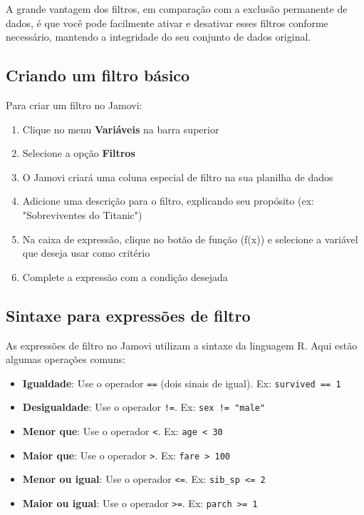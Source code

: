 A grande vantagem dos filtros, em comparação com a exclusão permanente de dados, é que você pode facilmente ativar e desativar esses filtros conforme necessário, mantendo a integridade do seu conjunto de dados original.

\subsection{Criando um filtro básico}

Para criar um filtro no Jamovi:

\begin{enumerate}
    \item Clique no menu \textbf{Variáveis} na barra superior
    \item Selecione a opção \textbf{Filtros}
    \item O Jamovi criará uma coluna especial de filtro na sua planilha de dados
    \item Adicione uma descrição para o filtro, explicando seu propósito (ex: "Sobreviventes do Titanic")
    \item Na caixa de expressão, clique no botão de função (f(x)) e selecione a variável que deseja usar como critério
    \item Complete a expressão com a condição desejada
\end{enumerate}


\subsection{Sintaxe para expressões de filtro}

As expressões de filtro no Jamovi utilizam a sintaxe da linguagem R. Aqui estão algumas operações comuns:

\begin{itemize}
    \item \textbf{Igualdade}: Use o operador \texttt{==} (dois sinais de igual). Ex: \texttt{survived == 1}
    \item \textbf{Desigualdade}: Use o operador \texttt{!=}. Ex: \texttt{sex != "male"}
    \item \textbf{Menor que}: Use o operador \texttt{<}. Ex: \texttt{age < 30}
    \item \textbf{Maior que}: Use o operador \texttt{>}. Ex: \texttt{fare > 100}
    \item \textbf{Menor ou igual}: Use o operador \texttt{<=}. Ex: \texttt{sib\_sp <= 2}
    \item \textbf{Maior ou igual}: Use o operador \texttt{>=}. Ex: \texttt{parch >= 1}
\end{itemize}

